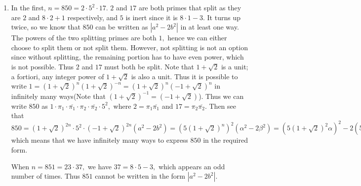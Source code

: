 \documentclass[]{article}
\begin{document}
\begin{enumerate}
\item In the first, $n=850=2 \cdot 5^2 \cdot 17.$ $2$ and $17$ are both primes that split as they are $2$ and $8\cdot 2 +1$ respectively, and $5$ is inert since it is $8 \cdot 1 -3.$ It turns up twice, so we know that $850$ can be written as $|a^2-2b^2|$ in at least one way. The powers of the two splitting primes are both $1,$ hence we can either choose to split them or not split them. However, not splitting is not an option since without splitting, the remaining portion has to have even power, which is not possible. Thus $2$ and $17$ must both be split. Note that $1+\sqrt{2}$ is a unit; a fortiori, any integer power of $1+\sqrt{2}$ is also a unit. Thus it is possible to write $1=(1+\sqrt{2})^n(1+\sqrt{2})^{-n}=(1+\sqrt{2})^n(-1+\sqrt{2})^n$ in infinitely many ways(Note that $ (1+\sqrt{2})^{-1}=(-1+\sqrt{2})$). Thus we can write $850$ as $ 1 \cdot \pi_1 \cdot \overline{\pi_1} \cdot \pi_2 \cdot \overline{\pi_2} \cdot 5^2,$ where $2= \pi_1 \overline{\pi_1}$ and $17=\pi_2 \overline{\pi_2}.$ Then see that $850= (1+\sqrt{2})^{2n} \cdot 5^2 \cdot (-1+\sqrt{2})^{2n}(a^2-2b^2)= (5(1+\sqrt{2})^n)^2 (\alpha^2 -2\beta^2)= (5(1+\sqrt{2})^2\alpha)^2-2(5(1+\sqrt{2})^2\beta)^2,$ which means that we have infinitely many ways to express $850$ in the required form.

When $n=851=23\cdot 37,$ we have $37=8\cdot 5-3,$ which appears an odd number of times. Thus $851$ cannot be written in the form $|a^2-2b^2|.$
\end{enumerate}
\end{document}
